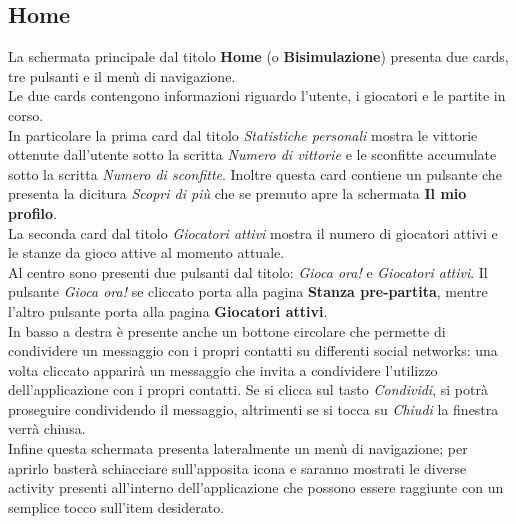 \documentclass[a4paper,11pt,twoside,openright]{report}
\begin{document}
\subsection{Home}
La schermata principale dal titolo \textbf{Home} (o \textbf{Bisimulazione}) presenta due cards, tre pulsanti e il menù di navigazione.\\
Le due cards contengono informazioni riguardo l'utente, i giocatori e le partite in corso.\\ 
In particolare la prima card dal titolo \textit{Statistiche personali}  mostra le vittorie ottenute dall'utente sotto la scritta \textit{Numero di vittorie} e le sconfitte 
accumulate sotto la scritta \textit{Numero di sconfitte}. Inoltre questa card contiene un pulsante che presenta la dicitura \textit{Scopri di più} che se premuto apre la
schermata \textbf{Il mio profilo}.\\
La seconda card dal titolo \textit{Giocatori attivi} mostra il numero di giocatori attivi e le stanze da gioco attive al momento attuale.\\
Al centro sono presenti due pulsanti dal titolo: \textit{Gioca ora!} e \textit{Giocatori attivi}. Il pulsante \textit{Gioca ora!} se cliccato porta alla pagina
\textbf{Stanza pre-partita}, mentre l'altro pulsante porta alla pagina \textbf{Giocatori attivi}.\\
In basso a destra è presente anche un bottone circolare che permette di condividere un messaggio con i propri contatti su differenti social networks: una volta cliccato
apparirà un messaggio che invita a condividere l'utilizzo dell'applicazione con i propri contatti. Se si clicca sul tasto \textit{Condividi}, si potrà proseguire condividendo
il messaggio, altrimenti se si tocca su \textit{Chiudi} la finestra verrà chiusa.\\
Infine questa schermata presenta lateralmente un menù di navigazione; per aprirlo basterà schiacciare sull'apposita icona e saranno mostrati le diverse activity
presenti all'interno dell'applicazione che possono essere raggiunte con un semplice tocco sull'item desiderato.
\end{document}
